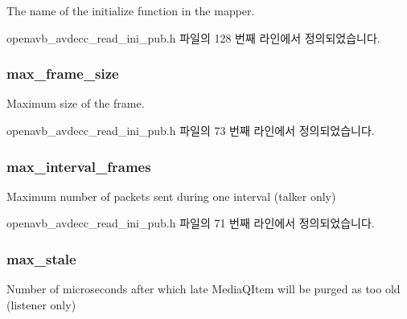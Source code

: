 The name of the initialize function in the mapper. 



openavb\+\_\+avdecc\+\_\+read\+\_\+ini\+\_\+pub.\+h 파일의 128 번째 라인에서 정의되었습니다.

\subsubsection[{\texorpdfstring{max\+\_\+frame\+\_\+size}{max_frame_size}}]{ max\+\_\+frame\+\_\+size}\hypertarget{structopenavb__tl__data__cfg_ac2af862bb15aba31178c61c260f5c54b}{}\label{structopenavb__tl__data__cfg_ac2af862bb15aba31178c61c260f5c54b}


Maximum size of the frame. 



openavb\+\_\+avdecc\+\_\+read\+\_\+ini\+\_\+pub.\+h 파일의 73 번째 라인에서 정의되었습니다.

\subsubsection[{\texorpdfstring{max\+\_\+interval\+\_\+frames}{max_interval_frames}}]{ max\+\_\+interval\+\_\+frames}\hypertarget{structopenavb__tl__data__cfg_abf63c5094d06b48eb2da41a9cf3e1d00}{}\label{structopenavb__tl__data__cfg_abf63c5094d06b48eb2da41a9cf3e1d00}


Maximum number of packets sent during one interval (talker only) 



openavb\+\_\+avdecc\+\_\+read\+\_\+ini\+\_\+pub.\+h 파일의 71 번째 라인에서 정의되었습니다.

\subsubsection[{\texorpdfstring{max\+\_\+stale}{max_stale}}]{ max\+\_\+stale}\hypertarget{structopenavb__tl__data__cfg_aea5235cb82456b3c3285f5f6910dd4dc}{}\label{structopenavb__tl__data__cfg_aea5235cb82456b3c3285f5f6910dd4dc}
Number of microseconds after which late Media\+Q\+Item will be purged as too old (listener only) 

